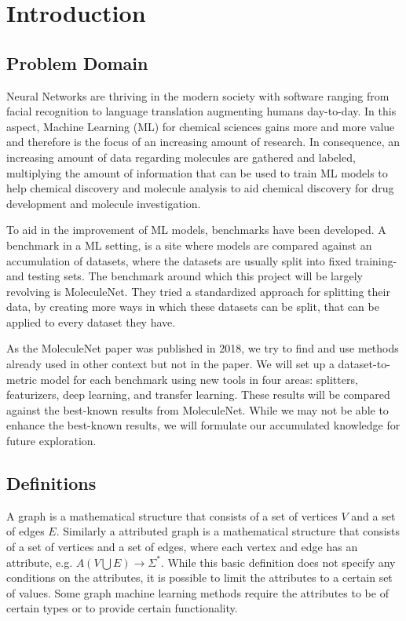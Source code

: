 \section{Introduction}

\subsection{Problem Domain}

Neural Networks are thriving in the modern society with software ranging from facial recognition to language translation augmenting humans day-to-day.
In this aspect, Machine Learning (ML) for chemical sciences gains more and more value and therefore is the focus of an increasing amount of research.
In consequence, an increasing amount of data regarding molecules are gathered and labeled, multiplying the amount of information that can be used to train ML models to help chemical discovery and molecule analysis to aid chemical discovery for drug development and molecule investigation.

To aid in the improvement of ML models, benchmarks have been developed.
A benchmark in a ML setting, is a site where models are compared against an accumulation of datasets, where the datasets are usually split into fixed training- and testing sets.
The benchmark around which this project will be largely revolving is MoleculeNet.
They tried a standardized approach for splitting their data, by creating more ways in which these datasets can be split, that can be applied to every dataset they have.

As the MoleculeNet paper was published in 2018, we try to find and use methods already used in other context but not in the paper.
We will set up a dataset-to-metric model for each benchmark using new tools in four areas: splitters, featurizers, deep learning, and transfer learning.
These results will be compared against the best-known results from MoleculeNet. While we may not be able to enhance the best-known results, we will formulate our accumulated knowledge for future exploration.

\subsection{Definitions}

A graph is a mathematical structure that consists of a set of vertices $V$ and a set of edges $E$.
Similarly a attributed graph is a mathematical structure that consists of a set of vertices and a set of edges, where each vertex and edge has an attribute, e.g. $A(V \bigcup E) \to \Sigma^*$.
While this basic definition does not specify any conditions on the attributes, it is possible to limit the attributes to a certain set of values.
Some graph machine learning methods require the attributes to be of certain types or to provide certain functionality.

